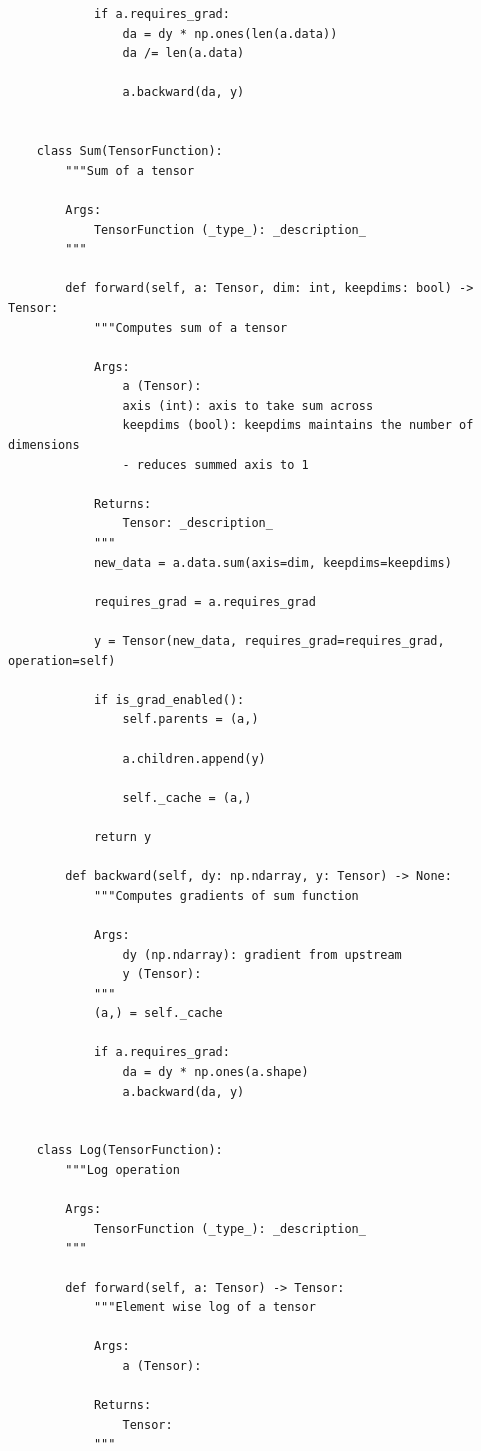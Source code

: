 \documentclass{article}
\begin{document}
\begin{verbatim}
            if a.requires_grad:
                da = dy * np.ones(len(a.data))
                da /= len(a.data)

                a.backward(da, y)


    class Sum(TensorFunction):
        """Sum of a tensor

        Args:
            TensorFunction (_type_): _description_
        """

        def forward(self, a: Tensor, dim: int, keepdims: bool) -> Tensor:
            """Computes sum of a tensor

            Args:
                a (Tensor):
                axis (int): axis to take sum across
                keepdims (bool): keepdims maintains the number of dimensions 
                - reduces summed axis to 1

            Returns:
                Tensor: _description_
            """
            new_data = a.data.sum(axis=dim, keepdims=keepdims)

            requires_grad = a.requires_grad

            y = Tensor(new_data, requires_grad=requires_grad, operation=self)

            if is_grad_enabled():
                self.parents = (a,)

                a.children.append(y)

                self._cache = (a,)

            return y

        def backward(self, dy: np.ndarray, y: Tensor) -> None:
            """Computes gradients of sum function

            Args:
                dy (np.ndarray): gradient from upstream
                y (Tensor):
            """
            (a,) = self._cache

            if a.requires_grad:
                da = dy * np.ones(a.shape)
                a.backward(da, y)


    class Log(TensorFunction):
        """Log operation

        Args:
            TensorFunction (_type_): _description_
        """

        def forward(self, a: Tensor) -> Tensor:
            """Element wise log of a tensor

            Args:
                a (Tensor):

            Returns:
                Tensor:
            """


\end{verbatim}
\end{document}
